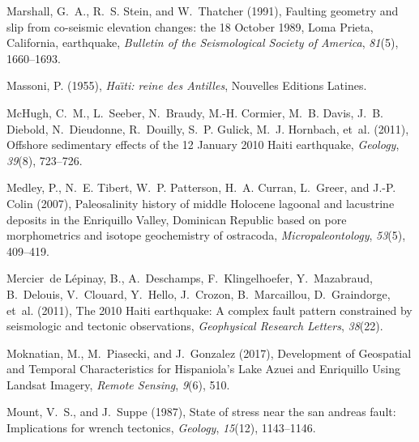 \documentclass[linenumbers,draft]{agujournal}
\begin{document}
\begin{thebibliography}{65}
Marshall, G.~A., R.~S. Stein, and W.~Thatcher (1991), {Faulting geometry and
  slip from co-seismic elevation changes: the 18 October 1989, Loma Prieta,
  California, earthquake}, \textit{Bulletin of the Seismological Society of
  America}, \textit{81}(5), 1660--1693.

Massoni, P. (1955), \textit{Ha{\"\i}ti: reine des {Antilles}}, Nouvelles
  Editions Latines.

McHugh, C.~M., L.~Seeber, N.~Braudy, M.-H. Cormier, M.~B. Davis, J.~B. Diebold,
  N.~Dieudonne, R.~Douilly, S.~P. Gulick, M.~J. Hornbach, et~al. (2011),
  Offshore sedimentary effects of the 12 {January 2010 Haiti} earthquake,
  \textit{Geology}, \textit{39}(8), 723--726.

Medley, P., N.~E. Tibert, W.~P. Patterson, H.~A. Curran, L.~Greer, and J.-P.
  Colin (2007), {Paleosalinity history of middle Holocene lagoonal and
  lacustrine deposits in the Enriquillo Valley, Dominican Republic based on
  pore morphometrics and isotope geochemistry of ostracoda},
  \textit{Micropaleontology}, \textit{53}(5), 409--419.

Mercier~de L{\'e}pinay, B., A.~Deschamps, F.~Klingelhoefer, Y.~Mazabraud,
  B.~Delouis, V.~Clouard, Y.~Hello, J.~Crozon, B.~Marcaillou, D.~Graindorge,
  et~al. (2011), {The 2010 Haiti earthquake: A complex} fault pattern
  constrained by seismologic and tectonic observations, \textit{Geophysical
  Research Letters}, \textit{38}(22).

Moknatian, M., M.~Piasecki, and J.~Gonzalez (2017), {Development of Geospatial
  and Temporal Characteristics for Hispaniola's Lake Azuei and Enriquillo Using
  Landsat Imagery}, \textit{Remote Sensing}, \textit{9}(6), 510.

Mount, V.~S., and J.~Suppe (1987), State of stress near the san andreas fault:
  Implications for wrench tectonics, \textit{Geology}, \textit{15}(12),
  1143--1146.


\end{thebibliography}
\end{document}
